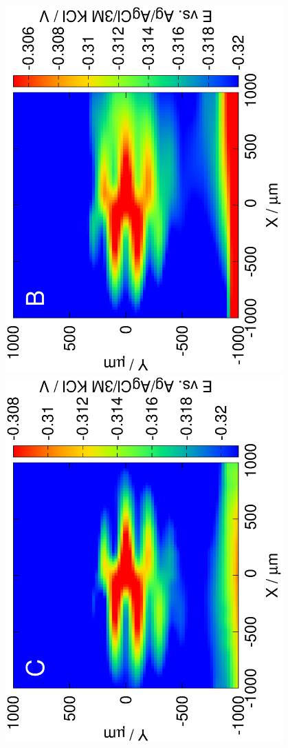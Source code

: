 \documentclass{beamer}
\begin{document}
\begin{frame}
\begin{columns}[T]
\begin{column}{.2\textwidth}
\includegraphics[trim = 10mm 30mm 0mm 10mm, clip, width=0.8\textwidth, angle=-90]{13121314.eps}\\
\includegraphics[trim = 10mm 30mm 0mm 10mm, clip, width=0.8\textwidth, angle=-90]{13121315.eps}\\

\end{column}
\end{columns}
\end{frame}
\end{document}
